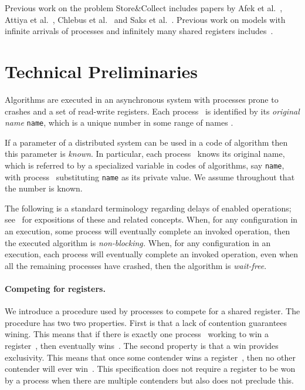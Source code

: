 \documentclass[11pt]{article}
\newcommand{\BBB}{\vspace*{-\bigskipamount}}
\newcommand{\Paragraph}[1]{\BBB\paragraph{#1}}
\begin{document}
Previous work on the problem Store\&Collect includes papers by Afek et al.~\cite{AfekST99}, Attiya et al.~\cite{AttiyaFK04,AttiyaF03,AttiyaFG02,AttiyaKPWW06}, Chlebus et al.~\cite{ChlebusKS-STOC04} and Saks et al.~\cite{SaksSW91}.
Previous work on models with infinite arrivals of processes and infinitely many shared registers includes~\cite{Aguilera04,AspnesSS02,ChocklerM05,GafniMT01,MerrittT03,MerrittT13}.





\section{Technical Preliminaries}

\label{sec:technical-preliminaries}


Algorithms are executed in an asynchronous system with  processes prone to crashes and a set of read-write registers.
Each process~ is identified by its \emph{original name} \texttt{name}, which is a unique number in some range of names .

If a parameter of a distributed system can be used in a code of algorithm then this parameter is \emph{known}.
In particular, each process~ knows its original name, which is referred to by a specialized variable in codes of algorithms, say \texttt{name}, with process~ substituting \texttt{name} as its private value.
We assume throughout that the number  is known.

The following is a standard terminology regarding delays of enabled operations; 
see~\cite{Attiya-Welch-book2004,HerlihyKozlovRajsbaum-book,Lynch-book96} for expositions of these and related concepts.
When, for any configuration in an execution, some process will eventually complete an invoked operation, then the executed algorithm is \emph{non-blocking.}
When, for any configuration in an execution, each process will eventually complete an invoked operation, even when all the remaining processes have crashed, then the algorithm is \emph{wait-free}.






\Paragraph{Competing for registers.}



We introduce a procedure used by processes to compete for a shared register.
The procedure  has two two properties.
First is that a lack of contention guarantees wining.
This means that if there is exactly one process~ working to win a register~, then  eventually wins~.
The second property is that a win provides exclusivity.
This means that once some contender wins a register~, then no other contender will ever win~.
This specification does not require a register to be won by a process when there are multiple contenders but also does not preclude this.
\end{document}
